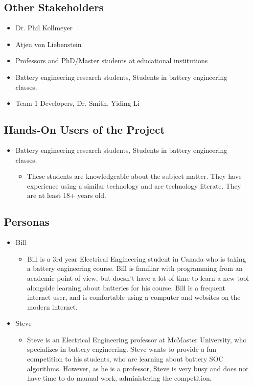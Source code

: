 \documentclass[12pt]{article}
\begin{document}
\subsection{Other Stakeholders}

\begin{itemize}
    \item Dr. Phil Kollmeyer
    \item Atjen von Liebenstein
    \item Professors and PhD/Master students at educational institutions
    \item Battery engineering research students, Students in battery engineering classes.
    \item Team 1 Developers, Dr. Smith, Yiding Li
\end{itemize}

\subsection{Hands-On Users of the Project}

\begin{itemize}
    \item Battery engineering research students, Students in battery engineering classes.
    \begin{itemize}
        \item These students are knowledgeable about the subject matter. They have experience using a similar technology and are technology literate. They are at least 18+ years old.
    \end{itemize}
\end{itemize}

\subsection{Personas}

\begin{itemize}
    \item Bill
    \begin{itemize}
        \item Bill is a 3rd year Electrical Engineering student in Canada who is taking a battery engineering course. Bill is familiar with programming from an academic point of view, but doesn’t have a lot of time to learn a new tool alongside learning about batteries for his course. Bill is a frequent internet user, and is comfortable using a computer and websites on the modern internet.
    \end{itemize}
    \item Steve
    \begin{itemize}
        \item Steve is an Electrical Engineering professor at McMaster University, who specializes in battery engineering. Steve wants to provide a fun competition to his students, who are learning about battery SOC algorithms. However, as he is a professor, Steve is very busy and does not have time to do manual work, administering the competition.
    \end{itemize}
\end{itemize}
\end{document}
